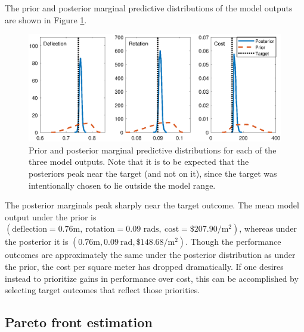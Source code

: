\documentclass[12pt]{article}
\begin{document}
%
The prior and posterior marginal predictive distributions of the model outputs are shown in Figure \ref{fig:prior_post_pred_comp}.
%
\begin{figure}
\centering
\includegraphics[scale=0.8]{FIG_prior_vs_posterior_dist}
\caption{Prior and posterior marginal predictive distributions for each of the three model outputs. Note that it is to be expected that the posteriors peak near the target (and not on it), since the target was intentionally chosen to lie outside the model range.}
\label{fig:prior_post_pred_comp}
\end{figure}
%
The posterior marginals peak sharply near the target outcome.
%
The mean model output under the prior is $(\text{deflection}=0.76\mathrm m,\ \text{rotation}=0.09\text{ rads},\ \text{cost}=\$207.90/\mathrm m^2)$, whereas under the posterior it is $(0.76\mathrm m,0.09\ \mathrm{rad},\$148.68/\mathrm m^2)$.
%
Though the performance outcomes are approximately the same under the posterior distribution as under the prior, the cost per square meter has dropped dramatically.
%
If one desires instead to prioritize gains in performance over cost, this can be accomplished by selecting target outcomes that reflect those priorities. 

\subsection{Pareto front estimation}\label{removing_cal_pars}

\end{document}

